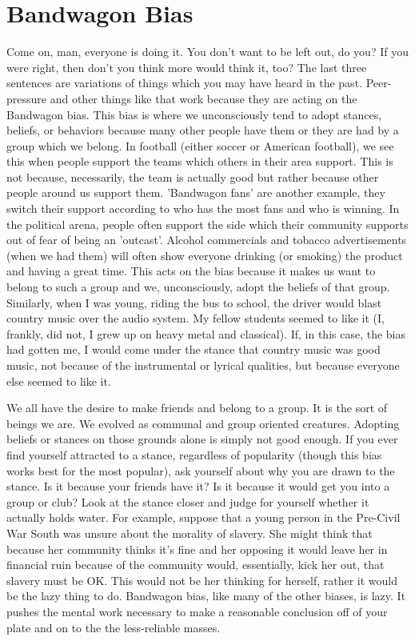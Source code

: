 \section{Bandwagon Bias}

Come on, man, everyone is doing it. You don't want to be left out, do you? If you were right, then don't you think more would think it, too? The last three sentences are variations of things which you may have heard in the past. Peer-pressure and other things like that work because they are acting on the Bandwagon bias. This bias is where we unconsciously tend to adopt stances, beliefs, or behaviors because many other people have them or they are had by a group which we belong.  In football (either soccer or American football), we see this when people support the teams which others in their area support. This is not because, necessarily, the team is actually good but rather because other people around us support them. 'Bandwagon fans' are another example, they switch their support according to who has the most fans and who is winning. In the political arena, people often support the side which their community supports out of fear of being an 'outcast'. Alcohol commercials and tobacco advertisements (when we had them) will often show everyone drinking (or smoking) the product and having a great time. This acts on the bias because it makes us want to belong to such a group and we, unconsciously, adopt the beliefs of that group. Similarly, when I was young, riding the bus to school, the driver would blast country music over the audio system. My fellow students seemed to like it (I, frankly, did not, I grew up on heavy metal and classical). If, in this case, the bias had gotten me, I would come under the stance that country music was good music, not because of the instrumental or lyrical qualities, but because everyone else seemed to like it.

We all have the desire to make friends and belong to a group. It is the sort of beings we are. We evolved as communal and group oriented creatures. Adopting beliefs or stances on those grounds alone is simply not good enough. If you ever find yourself attracted to a stance, regardless of popularity (though this bias works best for the most popular), ask yourself about why you are drawn to the stance. Is it because your friends have it? Is it because it would get you into a group or club? Look at the stance closer and judge for yourself whether it actually holds water. For example, suppose that a young person in the Pre-Civil War South  was unsure about the morality of slavery. She might think that because her community thinks it's fine and her opposing it would leave her in financial ruin because of the community would, essentially, kick her out, that slavery must be OK.  This would not be her thinking for herself, rather it would be the lazy thing to do. Bandwagon bias, like many of the other biases, is lazy. It pushes the mental work necessary to make a reasonable conclusion off of your plate and on to the the less-reliable masses.
